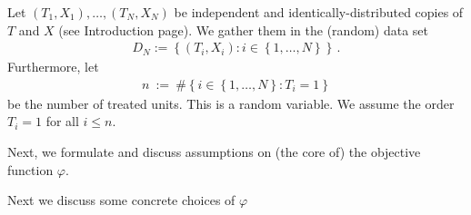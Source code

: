 Let $(T_1,X_1),\ldots,(T_N,X_N)$ be independent and identically-distributed copies of $T$ and $X$ (see Introduction page). 
We gather them in the (random) data set 
\begin{gather*}
D_N:=\left\{ (T_i,X_i)\colon i\in \left\{ 1,\ldots,N \right\} \right\}
\,.
\end{gather*}
Furthermore, let
\begin{gather*}
  n
  \ 
  :=
  \ 
  \# 
  \left\{ 
    i\in \left\{ 1,\ldots,N \right\}
    \colon
    T_i=1
  \right\}
\end{gather*}
be the number of treated units. This is a random variable. We assume the order $T_i=1$ for all $i\le n$.



Next, we formulate and discuss assumptions on (the core of) the objective function $\varphi$.



Next we discuss some concrete choices of $\varphi$


